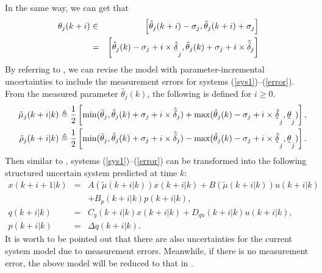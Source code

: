 \documentclass{singlecol-new}
\theoremstyle{TH}{
\newtheorem{lemma}{Lemma}
\newtheorem{theorem}[lemma]{Theorem}
\newtheorem{corrolary}[lemma]{Corrolary}
\newtheorem{conjecture}[lemma]{Conjecture}
\newtheorem{proposition}[lemma]{Proposition}
\newtheorem{claim}[lemma]{Claim}
\newtheorem{stheorem}[lemma]{Wrong Theorem}
\newtheorem{algorithm}{Algorithm}
}
\theoremstyle{THrm}{
\newtheorem{definition}{Definition}[section]
\newtheorem{question}{Question}[section]
\newtheorem{remark}{Remark}
\newtheorem{scheme}{Scheme}
}
\theoremstyle{THhit}{
\newtheorem{case}{Case}[section]
}
\begin{document}
In the same way, we can get that
\begin{eqnarray}
\theta _j (k + i) &\in& \left[ {\hat \theta _j (k + i) - \sigma _j
,\hat \theta _j (k + i) + \sigma _j } \right] \nonumber \\
&=& \left[ \hat\theta _j (k) -\sigma_j+i \times
\underset{\raise0.3em\hbox{$\smash{\scriptscriptstyle-}$}}{\hat\delta
} _j, \hat\theta _j (k) + \sigma_j+i \times \hat{\bar{
\delta}}_j\right]
\end{eqnarray}
By referring to \cite{park2004crl}, we can revise the model with
parameter-incremental uncertainties to include the measurement
errors for systems (\ref{sys1})--(\ref{error}). From the measured
parameter $\hat\theta_j (k)$, the following is defined for $i\geq
0$.
\begin{eqnarray}
&&\tilde \mu _j (k + i|k) \triangleq \frac{1}{2}\left[\min
(\bar{\theta}_j, \hat\theta _j (k) + \sigma_j+i \times \hat{\bar{
\delta}} _j ) +\max(\hat\theta _j (k) -\sigma_j+i \times
\underset{\raise0.3em\hbox{$\smash{\scriptscriptstyle-}$}}{\hat\delta}_j,
\underset{\raise0.3em\hbox{$\smash{\scriptscriptstyle-}$}}{\theta}_j)\right], \nonumber\\
&&\tilde \rho _j (k + i|k) \triangleq \frac{1} {2}\left[\min
(\bar{\theta}_j ,\hat\theta _j (k) +  \sigma_j+i \times \hat{\bar
{\delta}}_j ) -\max (\hat\theta _j (k) -\sigma_j+ i \times
\underset{\raise0.3em\hbox{$\smash{\scriptscriptstyle-}$}}{\hat\delta}_j
,\underset{\raise0.3em\hbox{$\smash{\scriptscriptstyle-}$}}{\theta}_j)\right].\nonumber
\end{eqnarray}
Then similar to \cite{park2004crl}, systems
(\ref{sys1})--(\ref{error}) can be transformed into the following
structured uncertain system predicted at time $k$:
\begin{eqnarray}\label{m1}
x(k + i + 1|k)&=& A(\tilde \mu (k + i|k))x(k + i|k) + B(\tilde \mu
(k + i|k)) u(k +i|k)\nonumber\\ &&+ B_p (k + i|k)p(k +
i|k),\\\label{m2}
q(k + i|k)&=&C_q(k + i|k)x(k + i|k)+ D_{qu}(k + i|k)u(k + i|k),\\
\label{m3} p(k+ i|k) &=& \Delta q(k + i|k).\hspace{9em}
\end{eqnarray}
It is worth to be pointed out that there are also uncertainties for
the current system model due to measurement errors. Meanwhile, if
there is no measurement error, the above model will be reduced to
that in \cite{park2004crl}.
\end{document}
